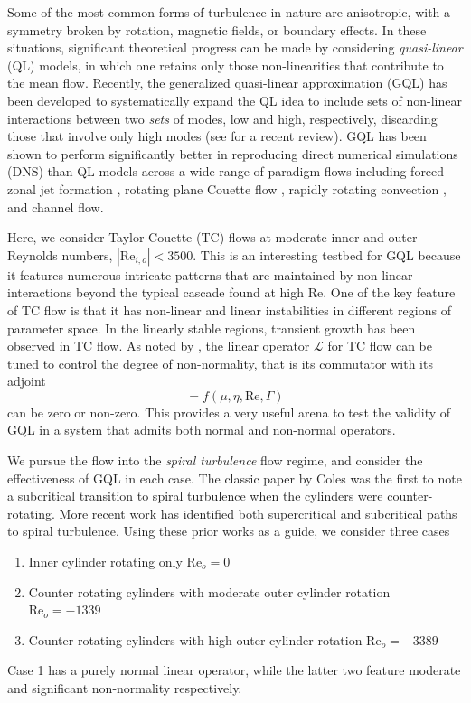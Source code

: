 \documentclass[openacc]{rstransa}%
\newcommand{\Reyn}{\mathrm{Re}}
\newcommand{\Lop}{\mathcal{L}}
\begin{document}
Some of the most common forms of turbulence in nature are anisotropic, with a symmetry broken by rotation, magnetic fields, or boundary effects. In these situations, significant theoretical progress can be made by considering \emph{quasi-linear} (QL) models, in which one retains only those non-linearities that contribute to the mean flow. Recently, the generalized quasi-linear approximation (GQL) has been developed to systematically expand the QL idea to include sets of non-linear interactions between two \emph{sets} of modes, low and high, respectively, discarding those that involve only high modes (see \cite{2022arXiv220505513M} for a recent review). GQL has been shown to perform significantly better in reproducing direct numerical simulations (DNS) than QL models across a wide range of paradigm flows including forced zonal jet formation \cite{2016PhRvL.116u4501M}, rotating plane Couette flow \cite{2017JFM...810..412T}, rapidly rotating convection \cite{2018RSPSA.47480422T}, and channel flow\cite{2019Kellam}. 

Here, we consider Taylor-Couette (TC) flows at moderate inner and outer Reynolds numbers, $|\Reyn_{i,o}| < 3500$. This is an interesting testbed for GQL because it features numerous intricate patterns that are maintained by non-linear interactions beyond the typical cascade found at high $\Reyn$. 
One of the key feature of TC flow is that it has non-linear and linear instabilities in different regions of parameter space. In the linearly stable regions, transient growth has been observed in TC flow. 
As noted by \cite{2002PhFl...14.3475H}, the linear operator $\Lop$ for TC flow can be tuned to control the degree of non-normality, that is its commutator with its adjoint
\begin{equation}
    [\Lop^\dagger, \Lop] = f(\mu, \eta, \Reyn, \Gamma)
\end{equation}
can be zero or non-zero. 
This provides a very useful arena to test the validity of GQL in a system that admits both normal and non-normal operators. 

We pursue the flow into the \emph{spiral turbulence} flow regime, and consider the effectiveness of GQL in each case. The classic paper by Coles \cite{1965JFM....21..385C} was the first to note a subcritical transition to spiral turbulence when the cylinders were counter-rotating. More recent work has identified both supercritical and subcritical paths to spiral turbulence\cite{2009PhRvE..80d6315M}.
Using these prior works as a guide, we consider three cases
\begin{enumerate}
    \item Inner cylinder rotating only $\Reyn_o = 0$
    \item Counter rotating cylinders with moderate outer cylinder rotation $\Reyn_o = -1339$
    \item Counter rotating cylinders with high outer cylinder rotation $\Reyn_o = -3389$
\end{enumerate}
Case 1 has a purely normal linear operator, while the latter two feature moderate and significant non-normality respectively. 
\end{document}
